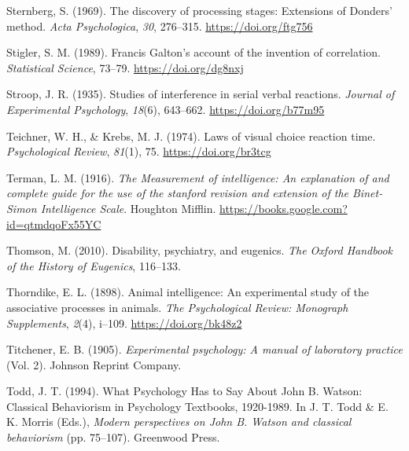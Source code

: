 \documentclass[
  oneside,
  12pt]{crumpbook}
\newlength{\cslhangindent}
\newlength{\cslentryspacingunit} %
\newenvironment{CSLReferences}[2] %
 {%
  \setlength{\parindent}{0pt}
  \ifodd #1
  \let\oldpar\par
  \def\par{\hangindent=\cslhangindent\oldpar}
  \fi
  \setlength{\parskip}{#2\cslentryspacingunit}
 }%
 {}
\begin{document}
\begin{CSLReferences}{1}{0}
\leavevmode{}%
Sternberg, S. (1969). The discovery of processing stages: {Extensions} of {Donders}' method. \emph{Acta Psychologica}, \emph{30}, 276--315. \url{https://doi.org/ftg756}

\leavevmode{}%
Stigler, S. M. (1989). Francis {Galton}'s account of the invention of correlation. \emph{Statistical Science}, 73--79. \url{https://doi.org/dg8nxj}

\leavevmode{}%
Stroop, J. R. (1935). Studies of interference in serial verbal reactions. \emph{Journal of Experimental Psychology}, \emph{18}(6), 643--662. \url{https://doi.org/b77m95}

\leavevmode{}%
Teichner, W. H., \& Krebs, M. J. (1974). Laws of visual choice reaction time. \emph{Psychological Review}, \emph{81}(1), 75. \url{https://doi.org/br3tcg}

\leavevmode{}%
Terman, L. M. (1916). \emph{The {Measurement} of intelligence: {An} explanation of and complete guide for the use of the stanford revision and extension of the {Binet}-{Simon Intelligence Scale}}. {Houghton Mifflin}. \url{https://books.google.com?id=qtmdqoFx55YC}

\leavevmode{}%
Thomson, M. (2010). Disability, psychiatry, and eugenics. \emph{The Oxford Handbook of the History of Eugenics}, 116--133.

\leavevmode{}%
Thorndike, E. L. (1898). Animal intelligence: {An} experimental study of the associative processes in animals. \emph{The Psychological Review: Monograph Supplements}, \emph{2}(4), i--109. \url{https://doi.org/bk48z2}

\leavevmode{}%
Titchener, E. B. (1905). \emph{Experimental psychology: {A} manual of laboratory practice} (Vol. 2). {Johnson Reprint Company}.

\leavevmode{}%
Todd, J. T. (1994). What {Psychology Has} to {Say About John B}. {Watson}: {Classical Behaviorism} in {Psychology Textbooks}, 1920-1989. In J. T. Todd \& E. K. Morris (Eds.), \emph{Modern perspectives on {John B}. {Watson} and classical behaviorism} (pp. 75--107). {Greenwood Press}.


\end{CSLReferences}
\end{document}
